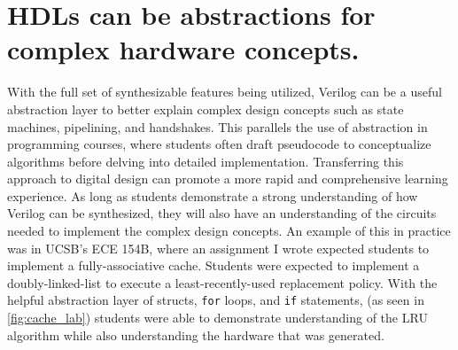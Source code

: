 \FloatBarrier

\section{HDLs can be abstractions for complex hardware concepts.}

With the full set of synthesizable features being utilized, Verilog can be a useful abstraction layer to better explain complex design concepts such as state machines, pipelining, and handshakes. This parallels the use of abstraction in programming courses, where students often draft pseudocode to conceptualize algorithms before delving into detailed implementation. Transferring this approach to digital design can promote a more rapid and comprehensive learning experience. As long as students demonstrate a strong understanding of how Verilog can be synthesized, they will also have an understanding of the circuits needed to implement the complex design concepts. An example of this in practice was in UCSB's ECE 154B, where an assignment I wrote expected students to implement a fully-associative cache. Students were expected to implement a doubly-linked-list to execute a least-recently-used replacement policy. With the helpful abstraction layer of structs, \texttt{for} loops, and \texttt{if} statements, (as seen in \autoref{fig:cache_lab}) students were able to demonstrate understanding of the LRU algorithm while also understanding the hardware that was generated.
